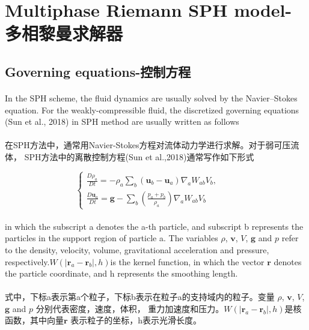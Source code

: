 \documentclass[UTF8]{ctexart}
\begin{document}
\section{Multiphase Riemann SPH model-多相黎曼求解器}

\subsection{Governing equations-控制方程}
\paragraph{\quad}In the SPH scheme, the fluid dynamics are usually solved 
                by the Navier–Stokes equation. For the weakly-compressible fluid, 
                the discretized governing equations (Sun et al., 2018) in SPH 
                method are usually written as follows
\paragraph{\quad}在SPH方法中，通常用Navier-Stokes方程对流体动力学进行求解。对于弱可压流体，
                SPH方法中的离散控制方程(Sun et al.,2018)通常写作如下形式

\begin{equation}
   \begin{cases} \frac{D \rho_a}{Dt}=-\rho_a\sum_{b}(\mathbf{u}_b - \mathbf{u}_a)\nabla_a W_{ab}V_b ,\\
   \frac{D \mathbf{u}_a}{Dt}=\mathbf{g}-\sum_{b}(\frac{p_a+p_b}{\rho_a})\nabla_a W_{ab} V_b \end{cases} \qquad
\end{equation}

\paragraph{\quad}in which the subscript a denotes the a-th particle, and subscript
                 b represents the particles in the support region of particle a. 
                 The variables $\rho$, $\mathbf{v}$, $V$, $\mathbf{g}$ and $p$ refer 
                 to the density, velocity, volume, gravitational acceleration and 
                 pressure, respectively.$W(|\mathbf{r}_a-\mathbf{r}_b|, h) $is the kernel function, 
                 in which the vector $\mathbf{r}$ denotes the particle coordinate, and h 
                 represents the smoothing length.
\paragraph{\quad}式中，下标a表示第a个粒子，下标b表示在粒子a的支持域内的粒子。变量
                $\rho$, $\mathbf{v}$, $V$, $\mathbf{g}$ and $p$ 分别代表密度，速度，体积，
                重力加速度和压力。$W(|\mathbf{r}_a-\mathbf{r}_b|, h) $是核函数，其中向量$\mathbf{r}$
                表示粒子的坐标，h表示光滑长度。
\end{document}
